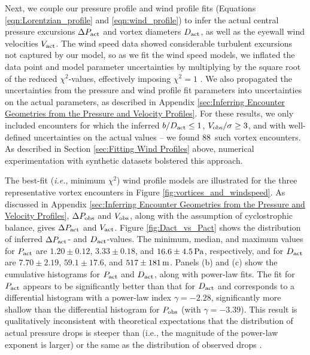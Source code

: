 \documentclass{aastex63}
\newcommand{\boverDactltone}{88}
\begin{document}
Next, we couple our pressure profile and wind profile fits (Equations \ref{eqn:Lorentzian_profile} and \ref{eqn:wind_profile}) to infer the actual central pressure excursions $\Delta P_{\rm act}$ and vortex diameters $D_{\rm act}$, as well as the eyewall wind velocities $V_{\rm act}$. The wind speed data showed considerable turbulent excursions not captured by our model, so as we fit the wind speed models, we inflated the data point and model parameter uncertainties by multiplying by the square root of the reduced $\chi^2$-values, effectively imposing $\chi^2 = 1$ \citep[\emph{cf.}][]{Press2007}. We also propagated the uncertainties from the pressure and wind profile fit parameters into uncertainties on the actual parameters, as described in Appendix \ref{sec:Inferring Encounter Geometries from the Pressure and Velocity Profiles}. For these results, we only included encounters for which the inferred $b/D_{\rm act} \leq 1$, $V_{\rm obs}/\sigma \geq 3$, and with well-defined uncertainties on the actual values -- we found \boverDactltone\ such vortex encounters. As described in Section \ref{sec:Fitting Wind Profiles} above, numerical experimentation with synthetic datasets bolstered this approach.

The best-fit (\emph{i.e.}, minimum $\chi^2$) wind profile models are illustrated for the three representative vortex encounters in Figure \ref{fig:vortices_and_windspeed}. As discussed in Appendix \ref{sec:Inferring Encounter Geometries from the Pressure and Velocity Profiles}, $\Delta P_{\rm obs}$ and $V_{\rm obs}$, along with the assumption of cyclostrophic balance, gives $\Delta P_{\rm act}$ and $V_{\rm act}$. Figure \ref{fig:Dact_vs_Pact} shows the distribution of inferred $\Delta P_{\rm act}$- and $D_{\rm act}$-values. The minimum, median, and maximum values for $P_{\rm act}$ are $1.20\pm0.12$, $3.33\pm0.18$, and $16.6\pm4.5\,{\rm Pa}$, respectively, and for $D_{\rm act}$ are $7.70\pm2.19$, $59.1\pm17.6$, and $517\pm181\,{\rm m}$. Panels (b) and (c) show the cumulative histograms for $P_{\rm act}$ and $D_{\rm act}$, along with power-law fits. The fit for $P_{\rm act}$ appears to be significantly better than that for $D_{\rm act}$ and corresponds to a differential histogram with a power-law index $\gamma = -2.28$, significantly more shallow than the differential histogram for $P_{\rm obs}$ (with $\gamma = -3.39$). This result is qualitatively inconsistent with theoretical expectations that the distribution of actual pressure drops is steeper than (i.e., the magnitude of the power-law exponent is larger) or the same as the distribution of observed drops \citep{2014JAtS...71.4461L, 2018Icar..299..166J, 2019Icar..317..209K}.
\end{document}
